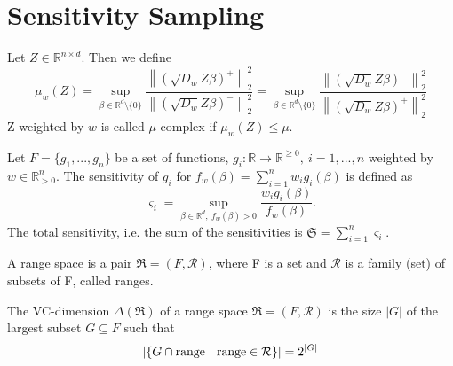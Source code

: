 \section{Sensitivity Sampling}

\begin{definition}
    Let $Z \in \mathbb{R}^{n \times d}$. Then we define
    $$
        \mu_w(Z) = \sup_{\beta \in \mathbb{R}^d \setminus \{0\}}
        \frac{\left \lVert (\sqrt{D_w} Z \beta)^+ \right \rVert_2^2}
        {\left \lVert (\sqrt{D_w} Z \beta)^- \right \rVert_2^2}
        =
        \sup_{\beta \in \mathbb{R}^d \setminus \{0\}}
        \frac{\left \lVert (\sqrt{D_w} Z \beta)^- \right \rVert_2^2}
        {\left \lVert (\sqrt{D_w} Z \beta)^+ \right \rVert_2^2}
    $$
    Z weighted by $w$ is called $\mu$-complex if $\mu_w(Z) \leq \mu$.
\end{definition}

\begin{definition}
    \label{def:sensitivity}
    Let $F = \{ g_1, ..., g_n \}$ be a set of functions,
    $g_i: \mathbb{R} \rightarrow \mathbb{R}^{\geq 0}, \ i=1,...,n$ weighted by
    $w \in \mathbb{R}^n_{>0}$.
    The sensitivity of $g_i$ for $f_w(\beta) = \sum_{i=1}^n w_i g_i(\beta)$ is defined as
    \begin{equation*}
        \varsigma_i = \sup_{\beta \in \mathbb{R}^d, \ f_w(\beta) > 0} \frac{w_i g_i(\beta)}{f_w(\beta)}.
    \end{equation*}
    The total sensitivity, i.e. the sum of the sensitivities is $\mathfrak{S} = \sum_{i=1}^n \varsigma_i$.
\end{definition}

\begin{definition}
    A range space is a pair $\mathfrak{R} = (F, \mathcal{R})$, where F is a set
    and $\mathcal{R}$ is a family (set) of subsets of F, called
    ranges.
\end{definition}

\begin{definition}
    The VC-dimension $\Delta(\mathfrak{R})$ of a range space $\mathfrak{R} = (F, \mathcal{R})$ is
    the size $|G|$ of the largest subset $G \subseteq F$ such that
    \begin{equation*}
        \left| \left\{ G \cap \textup{range} \ | \ \textup{range} \in \mathcal{R} \right\} \right|
        = 2^{|G|}
    \end{equation*}
\end{definition}

